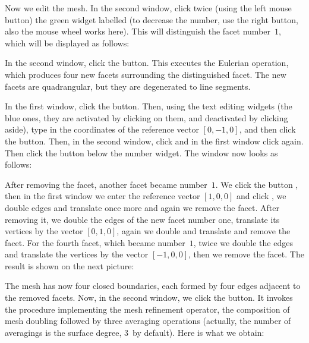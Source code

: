 Now we edit the mesh. In the second window, click twice (using the left
mouse button) the green widget labelled  (to decrease the
number, use the right button, also the mouse wheel works here).
This will distinguish the facet number~$1$, which will be displayed as
follows:


In the second window, click the  button. This executes
the Eulerian operation, which produces four new facets surrounding the
distinguished facet. The new facets are quadrangular, but they are
degenerated to line segments.

\newpage
In the first window, click the  button. Then, using the
text editing widgets (the blue ones, they are activated by clicking on them,
and deactivated by clicking aside), type in the coordinates of the reference
vector $[0,-1,0]$, and then click the  button.
Then, in the second window,
click  and in the first window click 
again. Then click the  button below the  number
widget. The window now looks as follows:


\newpage
After removing the facet, another facet became number~$1$.
We click the button ,
then in the first window we enter the reference vector $[1,0,0]$
and click , we double edges and translate once more and
again we remove the facet. After removing it, we double the edges of the new
facet number one, translate its vertices by the vector $[0,1,0]$, again we
double and translate and remove the facet. For the fourth facet, which
became number~$1$, twice we double the edges and translate the vertices by
the vector $[-1,0,0]$, then we remove the facet. The result is shown on the
next picture:


\newpage
The mesh has now four closed boundaries, each formed by four edges adjacent
to the removed facets. Now, in the second window, we click the 
button. It invokes the procedure implementing the mesh refinement operator,
the composition of mesh doubling followed by three averaging operations
(actually, the number of averagings is the surface degree, $3$~by default).
Here is what we obtain:


